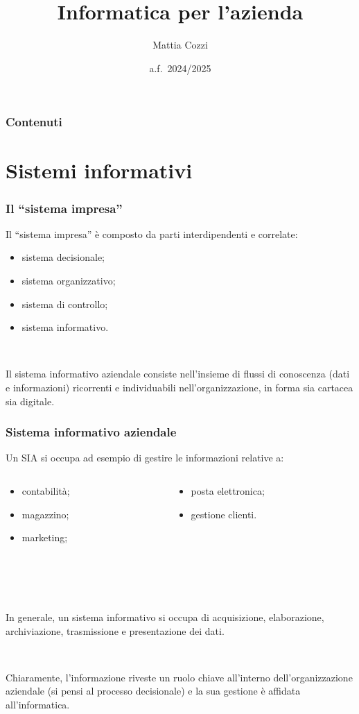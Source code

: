 \documentclass[]{beamer}
\title{Informatica per l'azienda}
\author{Mattia Cozzi}
\date{a.f.~2024/2025}
\begin{document}
\begin{frame}
  \titlepage
\end{frame}


\begin{frame}
\frametitle{Contenuti}
\tableofcontents
\end{frame}



\section{Sistemi informativi}


\begin{frame}
\frametitle{Il ``sistema impresa''}
Il ``sistema impresa'' è composto da parti interdipendenti e correlate:
\begin{itemize}
  \item sistema decisionale;
  \item sistema organizzativo;
  \item sistema di controllo;
  \item \alert<1>{sistema informativo}.\pause
\end{itemize}

~

Il sistema informativo aziendale consiste nell'insieme di flussi di conoscenza (dati e informazioni) ricorrenti e individuabili nell'organizzazione, in forma sia cartacea sia digitale.
\end{frame}



\begin{frame}
\frametitle{Sistema informativo aziendale}
Un SIA si occupa ad esempio di gestire le informazioni relative a:
\begin{columns}
\begin{column}{.4\textwidth}
  \begin{itemize}
    \item contabilità;
    \item magazzino;
    \item marketing;
  \end{itemize}
\end{column}
\begin{column}{.4\textwidth}
  \begin{itemize}
    \item posta elettronica;
    \item gestione clienti.
  \end{itemize}

  ~
\end{column}
\end{columns}
\pause

~

~

In generale, un sistema informativo si occupa di acquisizione, elaborazione, archiviazione, trasmissione e presentazione dei dati.\pause

~

Chiaramente, \alert<3>{l'informazione riveste un ruolo chiave all'interno dell'organizzazione aziendale} (si pensi al processo decisionale) e la sua gestione è affidata all'\alert<3>{informatica}.
\end{frame}
\end{document}
